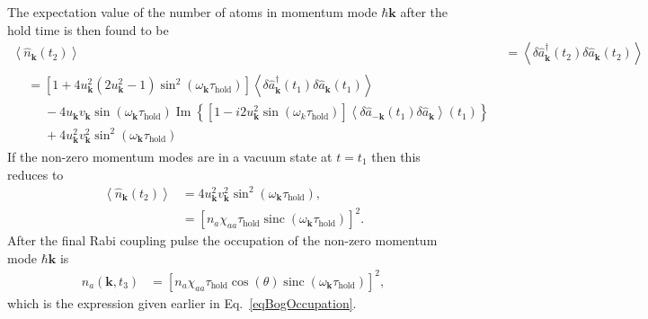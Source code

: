 \documentclass{iopart}
\DeclareMathOperator{\sinc}{sinc}
\newcommand{\expect}[1]{\ensuremath{\left<#1\right>}}
\renewcommand{\Im}{\operatorname{Im}}
\begin{document}
The expectation value of the number of atoms in momentum mode $\hbar\mathbf{k}$ after the hold time is then found to be
\begin{align}
  \expect{\hat{n}_\mathbf{k}(t_2)} &= \expect{\delta\hat{a}^\dagger_\mathbf{k}(t_2) \delta\hat{a}_\mathbf{k}(t_2)} \\
  \begin{split}
  &=\left[1 + 4 u_\mathbf{k}^2(2 u_\mathbf{k}^2 - 1)\sin^2(\omega_\mathbf{k} \tau_\text{hold})\right] \expect{\delta \hat{a}^\dagger_\mathbf{k}(t_1) \delta\hat{a}_\mathbf{k}(t_1)} \\
  &\phantom{\mathrel{=}}- 4 u_\mathbf{k} v_\mathbf{k} \sin(\omega_\mathbf{k}\tau_\text{hold}) \Im\left\{\left[1-i2 u_\mathbf{k}^2 \sin(\omega_k \tau_\text{hold})\right] \expect{\delta\hat{a}_{-\mathbf{k}}(t_1) \delta\hat{a}_\mathbf{k}}(t_1)\right\}\\
  &\phantom{\mathrel{=}} + 4 u_\mathbf{k}^2 v_\mathbf{k}^2 \sin^2(\omega_\mathbf{k}\tau_\text{hold})
  \end{split}
\end{align}
If the non-zero momentum modes are in a vacuum state at $t=t_1$ then this reduces to
\begin{align}
  \expect{\hat{n}_\mathbf{k}(t_2)} &= 4 u_\mathbf{k}^2 v_\mathbf{k}^2 \sin^2(\omega_\mathbf{k}\tau_\text{hold}), \\
  &= \left[n_a \chi_{aa} \tau_\text{hold} \sinc(\omega_\mathbf{k} \tau_\text{hold}) \right]^2.
\end{align}
After the final Rabi coupling pulse the occupation of the non-zero momentum mode $\hbar\mathbf{k}$ is
\begin{align}
  n_a(\mathbf{k}, t_3) &= \left[n_a \chi_{aa} \tau_\text{hold} \cos(\theta)\sinc(\omega_\mathbf{k} \tau_\text{hold}) \right]^2,
\end{align}
which is the expression given earlier in Eq.~\eqref{eqBogOccupation}.
\end{document}
